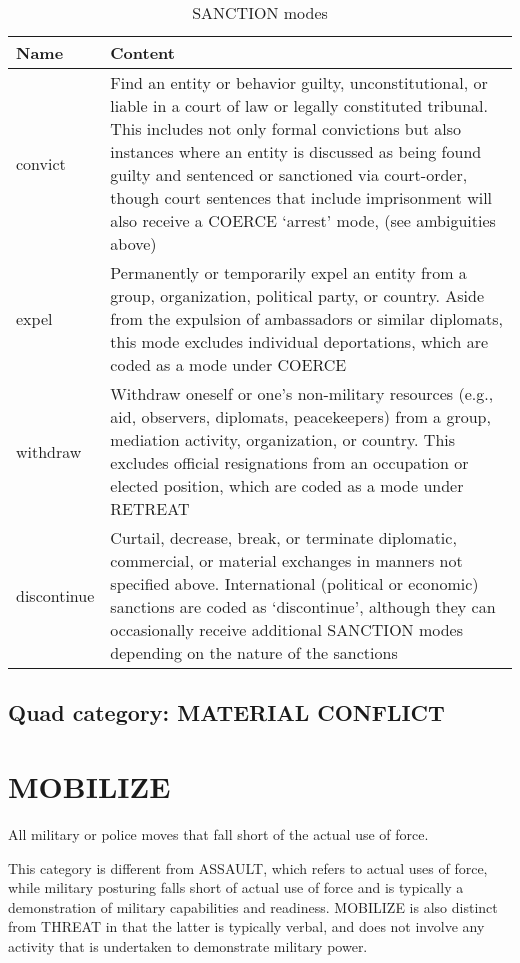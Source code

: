 \documentclass[11pt]{report}
\newcommand{\plcat}[1]{\textsf{#1}}
\begin{document}
\begin{table}[htp]
\caption{SANCTION modes}
\begin{center}
\begin{tabular}{|l|p{13cm}|}
\hline
Name & Content \\
\hline
convict &  Find an entity or behavior guilty, unconstitutional, or liable in a court of law or legally constituted tribunal. This includes not only formal convictions but also instances where an entity is discussed as being found guilty and sentenced or sanctioned via court-order, though court sentences that include imprisonment will also receive a \plcat{COERCE} `arrest' mode, (see ambiguities above)\\
expel & Permanently or temporarily expel an entity from a group, organization, political party, or country. Aside from the expulsion of ambassadors or similar diplomats, this mode excludes individual deportations, which are coded as a mode under \plcat{COERCE}\\
withdraw & Withdraw oneself or one's non-military resources (e.g., aid, observers, diplomats, peacekeepers) from a group, mediation activity, organization, or country. This excludes official resignations from an occupation or elected position, which are coded as a mode under \plcat{RETREAT}\\
discontinue & Curtail, decrease, break, or terminate diplomatic, commercial, or material exchanges in manners not specified above. International (political or economic) sanctions are coded as `discontinue', although they can occasionally receive additional \plcat{SANCTION} modes depending on the nature of the sanctions \\
\hline
\end{tabular}
\end{center}
\label{tab:sanctionmode}
\end{table}%

\subsection{Quad category: MATERIAL CONFLICT}

\newpage

\section{MOBILIZE}

All military or police moves that fall short of the actual use of force.

This category is different from \plcat{ASSAULT}, which refers to actual uses of force, while military posturing falls short of actual use of force and is typically a demonstration of military capabilities and readiness. \plcat{MOBILIZE} is also distinct from \plcat{THREAT} in that the latter is typically verbal, and does not involve any activity that is undertaken to demonstrate military power.
\end{document}
